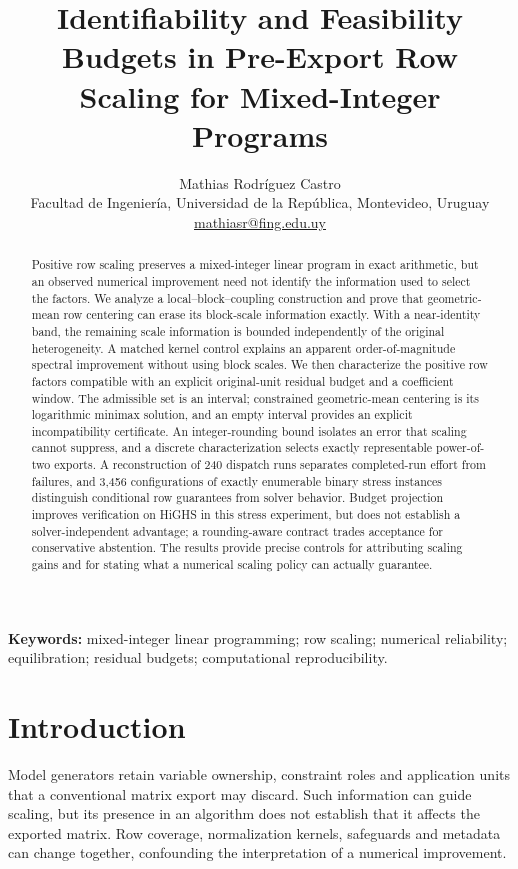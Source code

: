 \documentclass[11pt]{article}
\title{Identifiability and Feasibility Budgets in Pre-Export Row Scaling for Mixed-Integer Programs}
\author{Mathias Rodr\'iguez Castro\\
\small Facultad de Ingenier\'ia, Universidad de la Rep\'ublica, Montevideo, Uruguay\\
\small\href{mailto:mathiasr@fing.edu.uy}{mathiasr@fing.edu.uy}}
\date{}
\theoremstyle{definition}
\theoremstyle{remark}
\begin{document}
\maketitle
\begin{abstract}
Positive row scaling preserves a mixed-integer linear program in exact arithmetic, but
an observed numerical improvement need not identify the information used to select the
factors. We analyze a local--block--coupling construction and prove that geometric-mean
row centering can erase its block-scale information exactly. With a near-identity band,
the remaining scale information is bounded independently of the original heterogeneity.
A matched kernel control explains an apparent order-of-magnitude spectral improvement
without using block scales. We then characterize the positive row factors compatible
with an explicit original-unit residual budget and a coefficient window. The admissible
set is an interval; constrained geometric-mean centering is its logarithmic minimax
solution, and an empty interval provides an explicit incompatibility certificate.
An integer-rounding bound isolates an error that scaling cannot suppress, and a discrete
characterization selects exactly representable power-of-two exports.
A reconstruction of 240 dispatch runs separates completed-run effort from failures,
and 3,456 configurations of exactly enumerable binary stress instances distinguish
conditional row guarantees from solver behavior. Budget projection improves verification
on HiGHS in this stress experiment, but does not establish a solver-independent advantage;
a rounding-aware contract trades acceptance for conservative abstention. The results
provide precise controls for attributing scaling gains and for stating what a numerical
scaling policy can actually guarantee.
\end{abstract}
\noindent\textbf{Keywords:} mixed-integer linear programming; row scaling; numerical
reliability; equilibration; residual budgets; computational reproducibility.
\linenumbers

\section{Introduction}
Model generators retain variable ownership, constraint roles and application units
that a conventional matrix export may discard. Such information can guide scaling,
but its presence in an algorithm does not establish that it affects the exported
matrix. Row coverage, normalization kernels, safeguards and metadata can change
together, confounding the interpretation of a numerical improvement.
\end{document}
